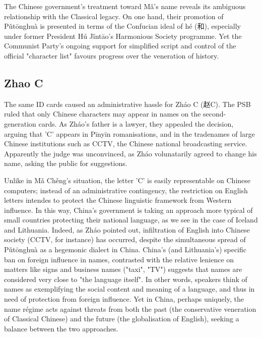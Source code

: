 The Chinese government's treatment toward Mǎ's name reveals its ambiguous
relationship with the Classical legacy. On one hand, their promotion of
Pǔtōnghuà is presented in terms of the Confucian ideal of hé ({\zafont 和}),
especially under former President Hú Jǐntāo's Harmonious Society programme. Yet
the Communist Party's ongoing support for simplified script and control of the
official "character list" favours progress over the veneration of history.

\subsection{Zhao C}

The same ID cards caused an administrative hassle for Zháo C ({\zafont 赵}C). The
PSB ruled that only Chinese characters may appear in names on the
second-generation cards. As Zháo's father is a lawyer, they appealed the
decision, arguing that 'C' appears in Pīnyīn romanisations, and in the
tradenames of large Chinese institutions such as CCTV, the Chinese national
broadcasting service. Apparently the judge was unconvinced, as Zháo volunatarily
agreed to change his name, asking the public for suggestions.

Unlike in Mǎ Chěng's situation, the letter 'C' is easily representable on
Chinese computers; instead of an administrative contingency, the restriction on
English letters intendes to protect the Chinese linguistic framework from
Western influence. In this way, China's government is taking an approach more
typical of small countries protecting their national language, as we see in the
case of Iceland and Lithuania. Indeed, as Zháo pointed out, infiltration of
English into Chinese society (CCTV, for instance) has occurred, despite the
simultaneous spread of Pǔtōnghuà as a hegemonic dialect in China. China's (and
Lithuania's) specific ban on foreign influence in names, contrasted with the
relative lenience on matters like signs and business names ("taxi", "TV")
suggests that names are considered very close to "the language itself". In other
words, speakers think of names as exemplifying the social content and meaning of
a language, and thus in need of protection from foreign influence. Yet in China,
perhaps uniquely, the name régime acts against threats from both the past (the
conservative veneration of Classical Chinese) and the future (the globalisation
of English), seeking a balance between the two approaches.


